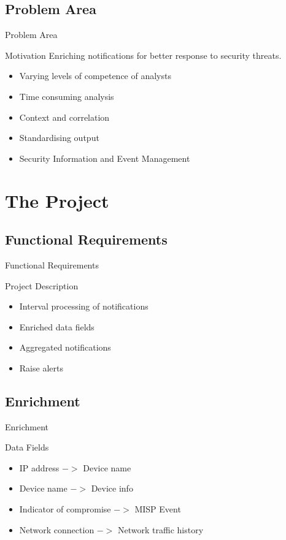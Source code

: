 \documentclass{beamer}
\begin{document}


\subsection{Problem Area}
\begin{frame}{Problem Area}
\begin{block}{Motivation}
Enriching notifications for better response to security threats.

\begin{itemize}
    \item Varying levels of competence of analysts
    \item Time consuming analysis
    \item Context and correlation
    \item Standardising output
    \item Security Information and Event Management
\end{itemize}
\end{block}
\end{frame}


\section{The Project}
\subsection{Functional Requirements}
\begin{frame}{Functional Requirements}
\begin{block}{Project Description}
\begin{itemize}
    \item Interval processing of notifications
    \item Enriched data fields
    \item Aggregated notifications
    \item Raise alerts
\end{itemize}
\end{block}
\end{frame}


\subsection{Enrichment}
\begin{frame}{Enrichment}
\begin{exampleblock}{Data Fields}
\begin{itemize}
    \item IP address $->$ Device name
    \item Device name $->$ Device info
    \item Indicator of compromise $->$ MISP Event
    \item Network connection $->$ Network traffic history
\end{itemize}
\end{exampleblock}
\end{frame}
\end{document}
